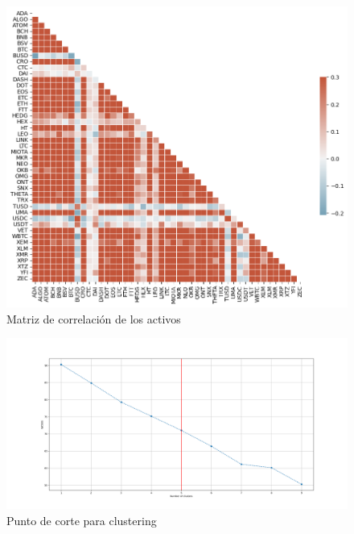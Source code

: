 \documentclass[runningheads,legalpaper,10pt]{etc/llncs}
\begin{document}
\begin{figure}[htp]
    \centering
    \includegraphics[scale=0.5]{images/corr_matrix.png}
    \caption{Matriz de correlación de los activos}
    \label{fig:corr_matrix}
\end{figure}

\begin{figure}[htp]
    \centering
    \includegraphics[scale=0.35]{images/knee_cluster.png}
    \caption{Punto de corte para clustering}
    \label{fig:knee_cluster}
\end{figure}
\end{document}
